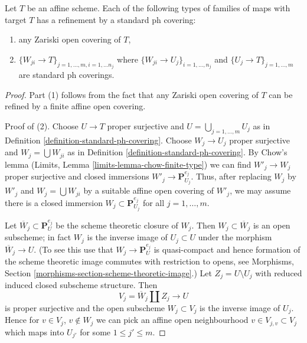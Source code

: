 \begin{lemma}
\label{lemma-refine-by-standard-ph}
Let $T$ be an affine scheme. Each of the following types of families
of maps with target $T$ has a refinement by a standard ph covering:
\begin{enumerate}
\item any Zariski open covering of $T$,
\item $\{W_{ji} \to T\}_{j = 1, \ldots, m, i = 1, \ldots n_j}$
where $\{W_{ji} \to U_j\}_{i = 1, \ldots, n_j}$
and $\{U_j \to T\}_{j = 1, \ldots, m}$ are standard ph coverings.
\end{enumerate}
\end{lemma}

\begin{proof}
Part (1) follows from the fact that any Zariski open covering of $T$
can be refined by a finite affine open covering.

\medskip\noindent
Proof of (2). Choose $U \to T$ proper surjective and
$U = \bigcup_{j = 1, \ldots, m} U_j$ as in
Definition \ref{definition-standard-ph-covering}.
Choose $W_j \to U_j$ proper surjective and $W_j = \bigcup W_{ji}$
as in Definition \ref{definition-standard-ph-covering}.
By Chow's lemma (Limits, Lemma \ref{limits-lemma-chow-finite-type})
we can find $W'_j \to W_j$ proper surjective
and closed immersions $W'_j \to \mathbf{P}^{e_j}_{U_j}$.
Thus, after replacing $W_j$ by $W'_j$ and $W_j = \bigcup W_{ji}$
by a suitable affine open covering of $W'_j$, we may assume
there is a closed immersion $W_j \subset \mathbf{P}^{e_j}_{U_j}$
for all $j = 1, \ldots, m$.

\medskip\noindent
Let $\overline{W}_j \subset \mathbf{P}^{e_j}_U$ be the
scheme theoretic closure of $W_j$. Then $W_j \subset \overline{W}_j$
is an open subscheme; in fact $W_j$ is the inverse image of
$U_j \subset U$ under the morphism $\overline{W}_j \to U$.
(To see this use that $W_j \to \mathbf{P}^{e_j}_U$ is quasi-compact
and hence formation of the scheme theoretic image commutes
with restriction to opens, see
Morphisms, Section \ref{morphisms-section-scheme-theoretic-image}.)
Let $Z_j = U \setminus U_j$
with reduced induced closed subscheme structure.
Then
$$
V_j = \overline{W}_j \amalg Z_j \to U
$$
is proper surjective and the open subscheme $W_j \subset V_j$
is the inverse image of $U_j$. Hence for $v \in V_j$, $v \not \in W_j$
we can pick an affine open neighbourhood $v \in V_{j, v} \subset V_j$
which maps into $U_{j'}$ for some $1 \leq j' \leq m$.


\end{proof}
